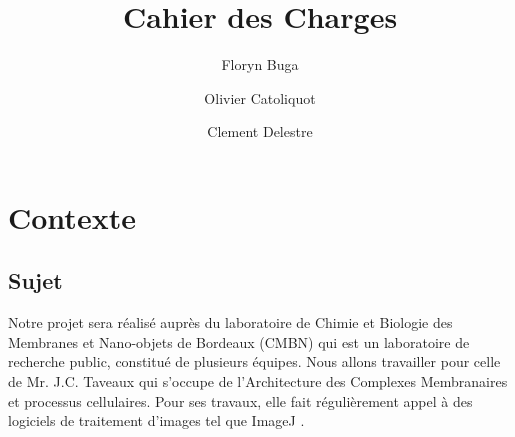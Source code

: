 \documentclass[11pt]{report}
\begin{document}





\author{Floryn Buga\and Olivier Catoliquot\and Clement Delestre}
\title{Cahier des Charges}

\maketitle %
\tableofcontents %
\newpage
\chapter{Contexte}
\section{Sujet}
Notre projet sera réalisé auprès du laboratoire de Chimie et Biologie des Membranes et Nano-objets de Bordeaux (CMBN)  qui est un laboratoire de recherche public, constitué de plusieurs équipes. Nous allons travailler pour celle de Mr. J.C. Taveaux qui s'occupe de l'Architecture des Complexes Membranaires et processus cellulaires. Pour ses travaux, elle fait régulièrement appel à des logiciels de traitement d'images tel que ImageJ \cite{imagej}.
\end{document}
